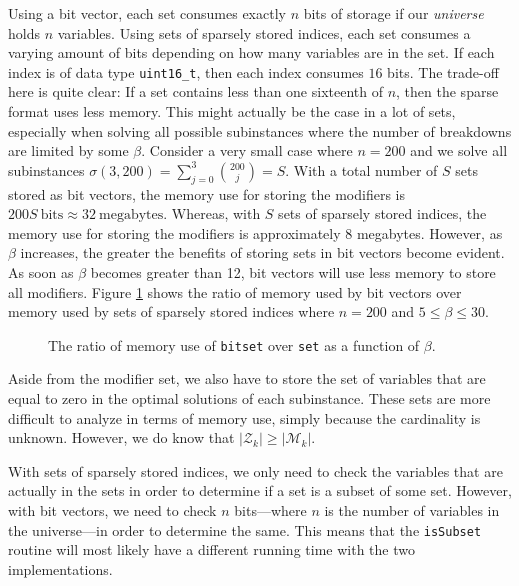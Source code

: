 Using a bit vector, each set consumes exactly $n$ bits of storage if our
\emph{universe} holds $n$ variables.
Using sets of sparsely stored indices, each set consumes a varying amount of
bits depending on how many variables are in the set. If each index is of data
type \texttt{uint16\_t}, then each index consumes $16$ bits. The trade-off
here is quite clear: If a set contains less than one sixteenth of $n$, then
the sparse format uses less memory. This might actually be the case in a lot
of sets, especially when solving all possible subinstances where the number
of breakdowns are limited by some $\beta$. Consider a very small case where
$n = 200$ and we solve all subinstances
$\sigma(3, 200) = \sum_{j=0}^{3} {\binom{200}{j}} = S$.
With a total number of $S$ sets stored as bit vectors, the memory use for
storing the modifiers is $200S~\textrm{bits} \approx 32~\textrm{megabytes}$.
Whereas, with $S$ sets of sparsely stored indices, the memory use for storing
the modifiers is approximately $8$ megabytes. However, as $\beta$ increases,
the greater the benefits of storing sets in bit vectors become evident. As soon
as $\beta$ becomes greater than 12, bit vectors will use less memory to store all
modifiers. Figure \ref{fig:bmem} shows the ratio of memory used by bit vectors
over memory used by sets of sparsely stored indices where $n = 200$ and
$5 \leq \beta \leq 30$.
\begin{figure}[ht!]
\centering

\caption{The ratio of memory use of \texttt{bitset} over \texttt{set} as a
         function of $\beta$.}
\label{fig:bmem}
\end{figure}
Aside from the modifier set, we also have to store the set of variables that
are equal to zero in the optimal solutions of each subinstance. These sets
are more difficult to analyze in terms of memory use, simply because the
cardinality is unknown. However, we do know that $|\mathcal{Z}_k| \geq
|\mathcal{M}_k|$.

With sets of sparsely stored indices, we only need to check the variables
that are actually in the sets in order to determine if a set is a subset
of some set. However, with bit vectors, we need to check $n$ bits---where $n$
is the number of variables in the universe---in order to determine the same.
This means that the \texttt{isSubset} routine will most likely have a different
running time with the two implementations.

